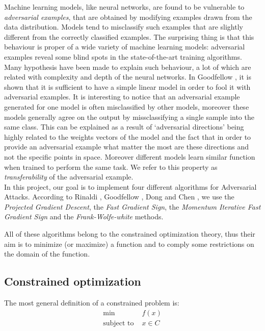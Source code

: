 \documentclass[10pt,twocolumn,letterpaper, english]{article}
\theoremstyle{definition}
\theoremstyle{plain}
\theoremstyle{plain}
\theoremstyle{plain}
\theoremstyle{plain}
\theoremstyle{remark}
\theoremstyle{remark}
\theoremstyle{definition}
\theoremstyle{definition}
\theoremstyle{definition}
\theoremstyle{definition}
\begin{document}
Machine learning models, like neural networks, are found to be vulnerable to \textit{adversarial examples}, that are obtained by modifying examples drawn from the data distribution. 
Models tend to misclassify such examples that are slightly different from the correctly classified examples. 
The surprising thing is that this behaviour is proper of a wide variety of machine learning models: adversarial examples reveal some blind spots in the state-of-the-art training algorithms. \\

Many hypothesis have been made to explain such behaviour, a lot of which are related with complexity and depth of the neural networks. 
In Goodfellow \cite{goodfellow}, it is shown that it is sufficient to have a simple linear model in order to fool it with adversarial examples. It is interesting to notice that an adversarial example generated for one model is often misclassified by other models, moreover these models generally agree on the output by missclassifying a single sample into the same class. This can be explained as a result of ‘adversarial directions’ being highly related to the weights vectors of the model and the fact that in order to provide an adversarial example what matter the most are these directions and not the specific points in space. Moreover different models learn similar function when trained to perform the same task. We refer to this property as \textit{transferability} of the adversarial example. \\ 

In this project, our goal is to implement four different algorithms for Adversarial Attacks. 
According to Rinaldi \cite{rinaldi}, Goodfellow \cite{goodfellow}, Dong \cite{momentum} and Chen \cite{frank}, we use the \textit{Projected Gradient Descent}, the \textit{Fast Gradient Sign}, the \textit{Momentum Iterative Fast Gradient Sign} and the \textit{Frank-Wolfe-white} methods. 

All of these algorithms belong to the constrained optimization theory, thus their aim is to minimize (or maximize) a function and to comply some restrictions on the domain of the function. 

\subsection{Constrained optimization}

The most general definition of a constrained problem is: 
\begin{align}
    \min \,&f(x) \label{min_prob} \\
    \text{subject to } &x \in C \nonumber
\end{align}
\end{document}
